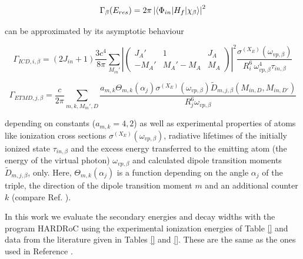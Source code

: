 \begin{equation}
 \Gamma_{\beta}(E_{res}) = 2\pi \left|
                           \braket{\Phi_{in}| H_f |\chi_{\beta}}
                           \right|^2
\end{equation}

can be approximated by its asymptotic behaviour

\begin{equation}
 \Gamma_{ICD,i,\beta} = (2J_{in}+1) \frac{3c^4}{8\pi}
                        \sum\limits_{M_{in}'}
                        \left| \left(
                        \begin{array}{ccc}
                        J_A'  & 1        & J_A\\
                        -M_A' & M_A'-M_A & M_A
                        \end{array}\right) \right|^2
                        \frac{\sigma^{(X_E)}(\omega_{vp,\beta})}
                        {R_i^6 \, \omega_{vp,\beta}^4 \tau_{in,\beta}}
\end{equation}


\begin{equation}
 \Gamma_{ETMD,j,\beta} = \frac{c}{2\pi} \sum\limits_{m,k,M_{in}',D}
                        \frac{a_{m,k} \Theta_{m,k}(\alpha_j) \sigma^{(X_E)}(\omega_{vp,\beta})
                              \tilde{D}_{m,j,\beta}(M_{in,D},M_{in,D'})}
                         {R_j^6 \omega_{vp,\beta}}
\end{equation}

depending on constants ($a_{m,k}=4,2$)
as well as experimental properties
of atoms like ionization cross sections
$\sigma^{(X_E)}(\omega_{vp,\beta})$, radiative lifetimes of the initially
ionized state $\tau_{in,\beta}$ and the excess energy transferred to the
emitting atom (the energy of the virtual photon) $\omega_{vp,\beta}$
and calculated dipole transition moments $\tilde{D}_{m,j,\beta}$, only.
Here, $\Theta_{m,k}(\alpha_j)$ is a function depending on the angle $\alpha_j$
of the triple, the direction of the dipole
transition moment $m$ and an additional counter $k$
(compare Ref. \cite{Fasshauer13}).

In this work we evaluate the secondary energies and decay widths with
the program HARDRoC \cite{HARDRoC,fasshauer2014} using the
experimental ionization energies of Table \ref{}
and data from the literature given in Tables \ref{} and \ref{}.
These are the same as the ones used in Reference \cite{Fasshauer13}.
